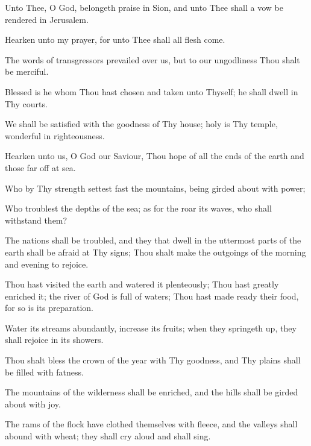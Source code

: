 Unto Thee, O God, belongeth praise in Sion, and unto Thee shall a vow be rendered in Jerusalem.

Hearken unto my prayer, for unto Thee shall all flesh come.

The words of transgressors prevailed over us, but to our ungodliness Thou shalt be merciful.

Blessed is he whom Thou hast chosen and taken unto Thyself; he shall dwell in Thy courts.

We shall be satisfied with the goodness of Thy house; holy is Thy temple, wonderful in righteousness.

Hearken unto us, O God our Saviour, Thou hope of all the ends of the earth and those far off at sea.

Who by Thy strength settest fast the mountains, being girded about with power; 

Who troublest the depths of the sea; as for the roar its waves, who shall withstand them?

The nations shall be troubled, and they that dwell in the uttermost parts of the earth shall be afraid at Thy signs; Thou shalt make the outgoings of the morning and evening to rejoice.

Thou hast visited the earth and watered it plenteously; Thou hast greatly enriched it; the river of God is full of waters; Thou hast made ready their food, for so is its preparation.

Water its streams abundantly, increase its fruits; when they springeth up, they shall rejoice in its showers.

Thou shalt bless the crown of the year with Thy goodness, and Thy plains shall be filled with fatness.

The mountains of the wilderness shall be enriched, and the hills shall be girded about with joy.

The rams of the flock have clothed themselves with fleece, and the valleys shall abound with wheat; they shall cry aloud and shall sing.
